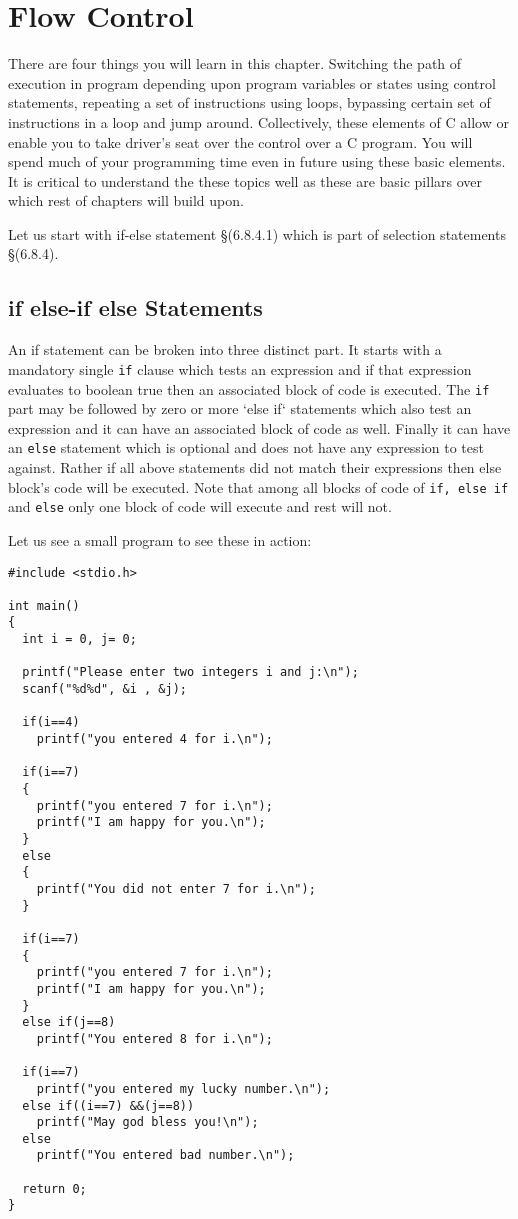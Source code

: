 \chapter{Flow Control}
There are four things you will learn in this chapter. Switching the path of 
execution in program depending upon program variables or states using control 
statements, repeating a set of instructions using loops, bypassing certain set
of instructions in a loop and jump around. Collectively, these elements of C
allow or enable you to take driver's seat over the control over a C program.
You will spend much of your programming time even in future using these basic
elements. It is critical to understand the these topics well as these are basic
pillars over which rest of chapters will build upon.

Let us start with if-else statement \S(6.8.4.1) which is part of selection
statements \S(6.8.4).

\section{if else-if else Statements}
An if statement can be broken into three distinct part. It starts with a
mandatory single \texttt{if} clause which tests an expression and if that expression
evaluates to boolean true then an associated block of code is executed. The
\texttt{if} part may be followed by zero or more `else if` statements which also test
an expression and it can have an associated block of code as well. Finally it
can have an \texttt{else} statement which is optional and does not have any expression
to test against. Rather if all above statements did not match their expressions
then else block's code will be executed. Note that among all blocks of code of
\texttt{if, else if} and \texttt{else} only one block of code will execute and rest will
not.

Let us see a small program to see these in action:

\begin{verbatim}
#include <stdio.h>

int main()
{
  int i = 0, j= 0;
    
  printf("Please enter two integers i and j:\n");
  scanf("%d%d", &i , &j);
  
  if(i==4)
    printf("you entered 4 for i.\n");

  if(i==7)
  {
    printf("you entered 7 for i.\n");
    printf("I am happy for you.\n");
  }
  else
  {
    printf("You did not enter 7 for i.\n");
  }
  
  if(i==7)
  {
    printf("you entered 7 for i.\n");
    printf("I am happy for you.\n");
  }
  else if(j==8)
    printf("You entered 8 for i.\n");
  
  if(i==7)
    printf("you entered my lucky number.\n");
  else if((i==7) &&(j==8))
    printf("May god bless you!\n");
  else
    printf("You entered bad number.\n");
  
  return 0;
}
\end{verbatim}


